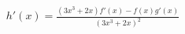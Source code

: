 \documentclass[preview]{standalone}
\begin{document}
\begin{align*}
h'(x) = \frac{(3x^3+2x)f'(x)-f(x)g'(x)}{(3x^3+2x)^2}
\end{align*}
\end{document}

